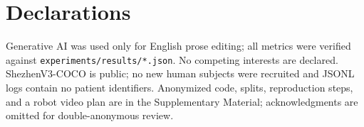 \section*{Declarations}
Generative AI was used only for English prose editing; all metrics were verified against \texttt{experiments/results/*.json}.
No competing interests are declared.
ShezhenV3-COCO is public; no new human subjects were recruited and JSONL logs contain no patient identifiers.
Anonymized code, splits, reproduction steps, and a robot video plan are in the Supplementary Material; acknowledgments are omitted for double-anonymous review.
